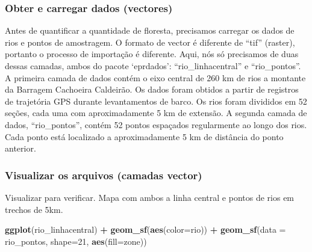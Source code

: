 \documentclass[
]{article}
\newenvironment{Shaded}{\begin{snugshade}}{\end{snugshade}}
\newcommand{\AttributeTok}[1]{\textcolor[rgb]{0.13,0.29,0.53}{#1}}
\newcommand{\DecValTok}[1]{\textcolor[rgb]{0.00,0.00,0.81}{#1}}
\newcommand{\FunctionTok}[1]{\textcolor[rgb]{0.13,0.29,0.53}{\textbf{#1}}}
\newcommand{\NormalTok}[1]{#1}
\newcommand{\SpecialCharTok}[1]{\textcolor[rgb]{0.81,0.36,0.00}{\textbf{#1}}}
\begin{document}
\hypertarget{obter-e-carregar-dados-vectores}{%
\subsubsection{Obter e carregar dados (vectores)}\label{obter-e-carregar-dados-vectores}}

Antes de quantificar a quantidade de floresta, precisamos carregar os dados de rios e pontos de amostragem.
O formato de vector é diferente de ``tif'' (raster), portanto o processo de importação é diferente.
Aqui, nós só precisamos de duas dessas camadas, ambos do pacote `eprdados': ``rio\_linhacentral'' e ``rio\_pontos''.
A primeira camada de dados contém o eixo central de 260 km de rios a montante da Barragem Cachoeira Caldeirão. Os dados foram obtidos a partir de registros de trajetória GPS durante levantamentos de barco. Os rios foram divididos em 52 seções, cada uma com aproximadamente 5 km de extensão. A segunda camada de dados, ``rio\_pontos'', contém 52 pontos espaçados regularmente ao longo dos rios. Cada ponto está localizado a aproximadamente 5 km de distância do ponto anterior.

\newpage

\hypertarget{visualizar-os-arquivos-camadas-vector}{%
\subsubsection{Visualizar os arquivos (camadas vector)}\label{visualizar-os-arquivos-camadas-vector}}

Visualizar para verificar. Mapa com ambos a linha central e pontos de rios em trechos de 5km.

\begin{Shaded}
\begin{Highlighting}[]
\FunctionTok{ggplot}\NormalTok{(rio\_linhacentral) }\SpecialCharTok{+}
  \FunctionTok{geom\_sf}\NormalTok{(}\FunctionTok{aes}\NormalTok{(}\AttributeTok{color=}\NormalTok{rio)) }\SpecialCharTok{+}
  \FunctionTok{geom\_sf}\NormalTok{(}\AttributeTok{data =}\NormalTok{ rio\_pontos, }\AttributeTok{shape=}\DecValTok{21}\NormalTok{, }\FunctionTok{aes}\NormalTok{(}\AttributeTok{fill=}\NormalTok{zone))}
\end{Highlighting}
\end{Shaded}
\end{document}
